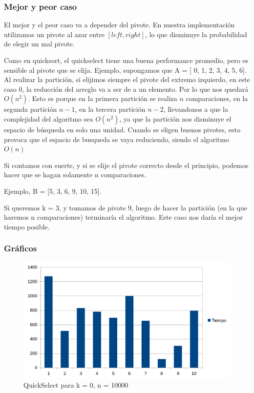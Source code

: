 \subsubsection{Mejor y peor caso}
El mejor y el peor caso va a depender del pivote. En nuestra implementación utilizamos un pivote al azar entre $[left, right]$, lo que disminuye la probabilidad de elegir un mal pivote.

Como en quicksort, el quickselect tiene una buena performance promedio, pero es sensible al pivote que se elija.
Ejemplo, supongamos que A = [ 0, 1, 2, 3, 4, 5, 6].
Al realizar la partición, si elijimos siempre el pivote del extremo izquierdo, en este caso 0, la reducción del arreglo va a ser de a un elemento. Por lo que nos quedará $O(n^2)$. Esto es porque en la primera partición se realiza $n$ comparaciones, en la segunda partición $n-1$, en la tercera partición $n-2$, llevandonos a que la complejidad del algoritmo sea $O(n^2)$, ya que la partición nos disminuye el espacio de búsqueda en solo una unidad.
Cuando se eligen buenos pivotes, esto provoca que el espacio de busqueda se vaya reduciendo, siendo el algoritmo $O(n)$ \cite{WIKIPEDIA_QUICKSELECT}

Si contamos con suerte, y si se elije el pivote correcto desde el principio, podemos hacer que se hagan solamente n comparaciones. 

Ejemplo, B = [5, 3, 6, 9, 10, 15].

Si queremos k = 3, y tomamos de pivote 9, luego de hacer la partición (en la que haremos n comparaciones) terminaría el algoritmo. Este caso nos daría el mejor tiempo posible.

\subsubsection{Gráficos}
\begin{figure}[H]
\centering
\includegraphics[width=\textwidth]{KZero/QuickSelectK0.png}
\caption{QuickSelect para k = 0, n = 10000}
\end{figure}

